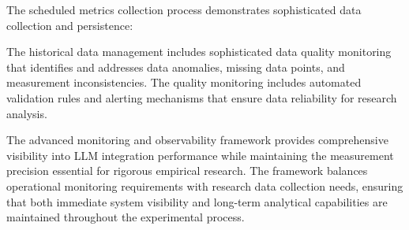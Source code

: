 
The scheduled metrics collection process demonstrates sophisticated data collection and persistence:



The historical data management includes sophisticated data quality monitoring that identifies and addresses data anomalies, missing data points, and measurement inconsistencies. The quality monitoring includes automated validation rules and alerting mechanisms that ensure data reliability for research analysis.


The advanced monitoring and observability framework provides comprehensive visibility into LLM integration performance while maintaining the measurement precision essential for rigorous empirical research. The framework balances operational monitoring requirements with research data collection needs, ensuring that both immediate system visibility and long-term analytical capabilities are maintained throughout the experimental process.

